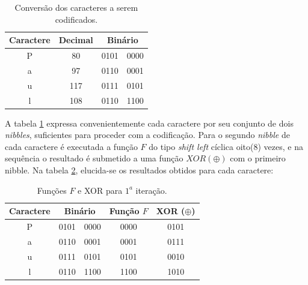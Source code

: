 \documentclass[a4paper,pra,aps,twocolumn,superscriptaddress,10pt,final]{revtex4-2}
\begin{document}
    \begin{table}[!htbp]
        \caption{Conversão dos caracteres a serem codificados.}
        \label{tab:tab1-caracteres}
        \begin{tabular}{|c|c|cl|}
            \hline
            \textbf{Caractere} & \textbf{Decimal} & \multicolumn{2}{c|}{\textbf{Binário}} \\ \hline
            P                  & 80               & \multicolumn{1}{c|}{0101}    & 0000   \\ \hline
            a                  & 97               & \multicolumn{1}{c|}{0110}    & 0001   \\ \hline
            u                  & 117              & \multicolumn{1}{c|}{0111}    & 0101   \\ \hline
            l                  & 108              & \multicolumn{1}{c|}{0110}    & 1100   \\ \hline
        \end{tabular}
    \end{table}

    A tabela \ref{tab:tab1-caracteres} expressa convenientemente cada caractere por seu conjunto de dois \textit{nibbles}, suficientes para proceder com a codificação. Para o segundo \textit{nibble} de cada caractere é executada a função $F$ do tipo \textit{shift left} cíclica oito($8$) vezes, e na sequência o resultado é submetido a uma função $XOR (\oplus)$ com o primeiro nibble. Na tabela \ref{tab:tab2-funcao}, elucida-se os resultados obtidos para cada caractere:

    \begin{table}[!htbp]
        \caption{Funções $F$ e XOR para $1^a$ iteração.}
        \label{tab:tab2-funcao}
        \begin{tabular}{|c|cc|c|c|}
            \hline
            \textbf{Caractere} & \multicolumn{2}{c|}{\textbf{Binário}} & \textbf{Função $F$} & \textbf{XOR ($\oplus$)} \\ \hline
            P                  & \multicolumn{1}{c|}{0101}    & 0000   & 0000                & 0101                                 \\ \hline
            a                  & \multicolumn{1}{c|}{0110}    & 0001   & 0001                & 0111                                 \\ \hline
            u                  & \multicolumn{1}{c|}{0111}    & 0101   & 0101                & 0010                                 \\ \hline
            l                  & \multicolumn{1}{c|}{0110}    & 1100   & 1100                & 1010                                 \\ \hline
        \end{tabular}
    \end{table}
\end{document}
